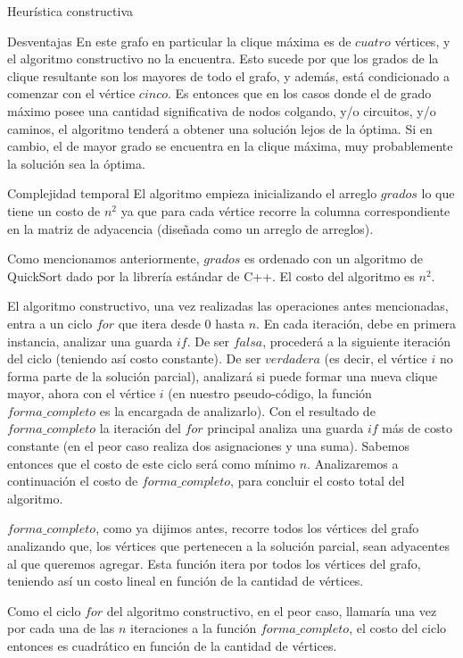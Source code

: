 \begin{section}{Heurística constructiva}
\begin{subsection}{Desventajas }
			En este grafo en particular la clique máxima es de $cuatro$ vértices, y el algoritmo constructivo no la encuentra. Esto sucede por que los grados de la clique resultante son los mayores de todo el grafo, y además, está condicionado a comenzar con el vértice $cinco$. Es entonces que en los casos donde el de grado máximo posee una cantidad significativa de nodos colgando, y/o circuitos, y/o caminos, el algoritmo tenderá a obtener una solución lejos de la óptima. Si en cambio, el de mayor grado se encuentra en la clique máxima, muy probablemente la solución sea la óptima.
		\end{subsection}
		\begin{subsection}{Complejidad temporal}
			El algoritmo empieza inicializando el arreglo $grados$ lo que tiene un costo de $n^2$ ya que para cada vértice recorre la columna correspondiente en la matriz de adyacencia (diseñada como un arreglo de arreglos).
			
			Como mencionamos anteriormente, $grados$ es ordenado con un algoritmo de QuickSort dado por la librería estándar de C++. El costo del algoritmo es $n^2$.
			
			El algoritmo constructivo, una vez realizadas las operaciones antes mencionadas, entra a un ciclo $for$ que itera desde $0$ hasta $n$. En cada iteración, debe en primera instancia, analizar una guarda $if$. De ser $falsa$, procederá a la siguiente iteración del ciclo (teniendo así costo constante). De ser $verdadera$ (es decir, el vértice $i$ no forma parte de la solución parcial), analizará si puede formar una nueva clique mayor, ahora con el vértice $i$ (en nuestro pseudo-código, la función $forma\_completo$ es la encargada de analizarlo). Con el resultado de $forma\_completo$ la iteración del $for$ principal analiza una guarda $if$ más de costo constante (en el peor caso realiza dos asignaciones y una suma). Sabemos entonces que el costo de este ciclo será como mínimo $n$. Analizaremos a continuación el costo de $forma\_completo$, para concluir el costo total del algoritmo.
			
			$forma\_completo$, como ya dijimos antes, recorre todos los vértices del grafo analizando que, los vértices que pertenecen a la solución parcial, sean adyacentes al que queremos agregar. Esta función itera por todos los vértices del grafo, teniendo así un costo lineal en función de la cantidad de vértices.
			
			Como el ciclo $for$ del algoritmo constructivo, en el peor caso, llamaría una vez por cada una de las $n$ iteraciones a la función $forma\_completo$, el costo del ciclo entonces es cuadrático en función de la cantidad de vértices.
			

\end{subsection}
\end{section}
